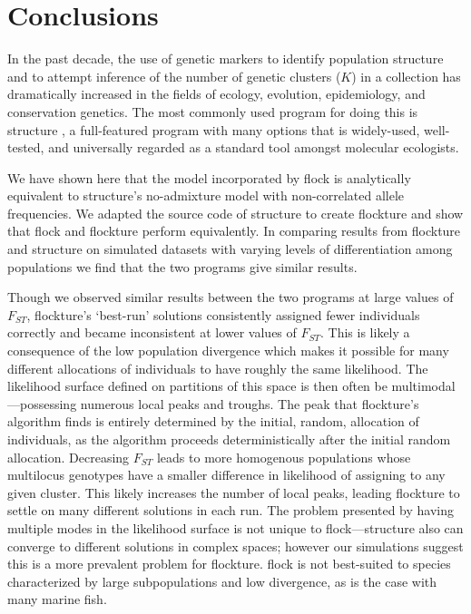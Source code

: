 \section*{Conclusions}
In the past decade, the use of genetic markers to identify population structure and to attempt inference of
the number of genetic clusters ($K$) in a collection has dramatically increased in the fields of ecology, evolution, 
epidemiology, and conservation
genetics. The most commonly used program for doing this is {\sc structure} \citep{Pritchardetal2000,Falushetal2003}, 
a full-featured program with many options that is widely-used, well-tested, and universally regarded as a standard tool amongst molecular ecologists. 


We have shown here that the model incorporated by {\sc flock} is analytically equivalent to {\sc structure}'s 
no-admixture model 
with non-correlated allele frequencies.
We adapted the source code of {\sc structure} to create {\sc flockture} and show that
{\sc flock} and {\sc flockture}  perform equivalently. 
In comparing results from {\sc flockture} and {\sc structure} 
on simulated datasets with varying levels of differentiation among populations
we find that the two programs give similar results.

Though we observed similar results
between the two programs at large values of $F_{ST}$, 
{\sc flockture}'s `best-run' solutions consistently assigned fewer individuals correctly
and became inconsistent at lower values of $F_{ST}$.
This is likely a consequence of the low population divergence which
makes it possible for many different allocations of individuals to
have roughly the same likelihood.
The likelihood surface defined on partitions of this space is then often
be multimodal---possessing numerous local peaks and troughs.
The peak that  {\sc flockture}'s algorithm finds is entirely determined by the initial, random, allocation of 
individuals, as the algorithm proceeds deterministically after the initial random allocation.
Decreasing $F_{ST}$ leads to more homogenous 
populations whose multilocus genotypes have a smaller difference in 
likelihood of assigning to any given cluster. This likely increases the number of
local peaks, leading {\sc flockture} to settle on many different solutions in each run. The problem presented by having multiple modes in the likelihood surface 
is not unique to {\sc flock}---{\sc structure} also can converge to 
different solutions in complex spaces; however our simulations suggest this is a more  
prevalent problem for {\sc flockture}.
{\sc flock} is not best-suited to species characterized by large
subpopulations and low divergence, as is the case with many 
marine fish.   
   

